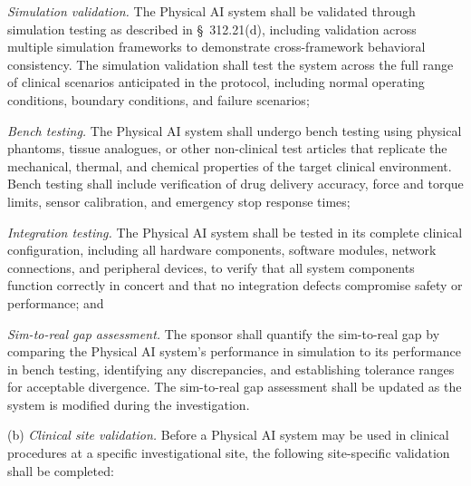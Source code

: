\documentclass[11pt]{article}
\begin{document}
\begin{description}[leftmargin=0.8cm,style=sameline]
\item[(1)] \textit{Simulation validation.} The Physical AI system shall be validated through simulation testing as described in \S~312.21(d), including validation across multiple simulation frameworks to demonstrate cross-framework behavioral consistency. The simulation validation shall test the system across the full range of clinical scenarios anticipated in the protocol, including normal operating conditions, boundary conditions, and failure scenarios;
\item[(2)] \textit{Bench testing.} The Physical AI system shall undergo bench testing using physical phantoms, tissue analogues, or other non-clinical test articles that replicate the mechanical, thermal, and chemical properties of the target clinical environment. Bench testing shall include verification of drug delivery accuracy, force and torque limits, sensor calibration, and emergency stop response times;
\item[(3)] \textit{Integration testing.} The Physical AI system shall be tested in its complete clinical configuration, including all hardware components, software modules, network connections, and peripheral devices, to verify that all system components function correctly in concert and that no integration defects compromise safety or performance; and
\item[(4)] \textit{Sim-to-real gap assessment.} The sponsor shall quantify the sim-to-real gap by comparing the Physical AI system's performance in simulation to its performance in bench testing, identifying any discrepancies, and establishing tolerance ranges for acceptable divergence. The sim-to-real gap assessment shall be updated as the system is modified during the investigation.
\end{description}

(b) \textit{Clinical site validation.} Before a Physical AI system may be used in clinical procedures at a specific investigational site, the following site-specific validation shall be completed:
\end{document}
